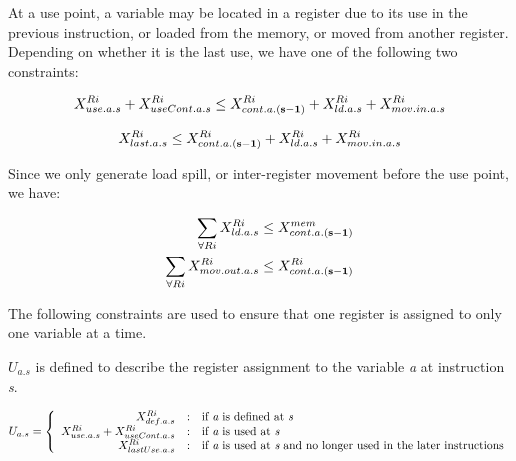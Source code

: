 At a use point, a variable may be located in a register due to its use in the
previous instruction, or loaded from the memory, or moved
from another register. Depending on whether it is the last use, we
have one of the following two constraints:

\begin{small}
\begin{eqnarray}
X_{use.a.s}^{Ri} + X_{useCont.a.s}^{Ri} \leq X_{cont.a.{\bf(s-1)}}^{Ri} + X_{ld.a.s}^{Ri} + X_{mov.in.a.s}^{Ri} \nonumber 
\end{eqnarray}
\end{small}
\vspace{-0.1in}
\begin{small}
\begin{eqnarray}X_{last.a.s}^{Ri} \leq X_{cont.a.{\bf(s-1)}}^{Ri} + X_{ld.a.s}^{Ri} + X_{mov.in.a.s}^{Ri} 
\end{eqnarray}
\end{small}

Since we only generate load spill, or inter-register movement
before the use point, we have:

\begin{small}
\begin{eqnarray}
\sum_{\forall Ri}X_{ld.a.s}^{Ri} \leq X_{cont.a.{\bf(s-1)}}^{mem} \nonumber \\
\sum_{\forall Ri}X_{mov.out.a.s}^{Ri} \leq X_{cont.a.{\bf(s-1)}}^{Ri}
\end{eqnarray}
\end{small}

The following constraints are used to ensure that one register is assigned to
only one variable at a time.

$U_{a.s}$ is defined to describe the register assignment to the variable {\it a}
at instruction {\it s}.

\begin{small}
\begin{eqnarray}
U_{a.s} = \left\{\begin{array}{r@{\quad:\quad}l} 
X_{def.a.s}^{Ri} & \mbox{if {\it a} is defined at {\it s}} \\ 
X_{use.a.s}^{Ri} + X_{useCont.a.s}^{Ri} & \mbox{if {\it a} is used at {\it s}} \\
X_{lastUse.a.s}^{Ri} & \mbox{if {\it a} is used at {\it s} and no longer used in the later instructions}\end{array}\right. 
\end{eqnarray}
\end{small}

